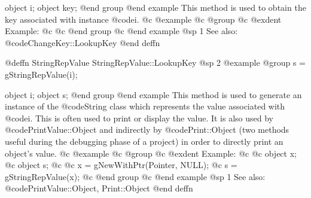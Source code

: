 object  i;
object  key;
@end group
@end example
This method is used to obtain the key associated with instance @code{i}.
@c @example
@c @group
@c @exdent Example:
@c 
@c @end group
@c @end example
@sp 1
See also:  @code{ChangeKey::LookupKey}
@end deffn










@deffn {StringRepValue} StringRepValue::LookupKey
@sp 2
@example
@group
s = gStringRepValue(i);

object  i;
object  s;
@end group
@end example
This method is used to generate an instance of the @code{String} class
which represents the value associated with @code{i}.  This is often
used to print or display the value.  It is also used by
@code{PrintValue::Object} and indirectly by @code{Print::Object}
(two methods useful during the debugging phase of a project)
in order to directly print an object's value.
@c @example
@c @group
@c @exdent Example:
@c 
@c object  x;
@c object  s;
@c 
@c x = gNewWithPtr(Pointer, NULL);
@c s = gStringRepValue(x);
@c @end group
@c @end example
@sp 1
See also:  @code{PrintValue::Object, Print::Object}
@end deffn








